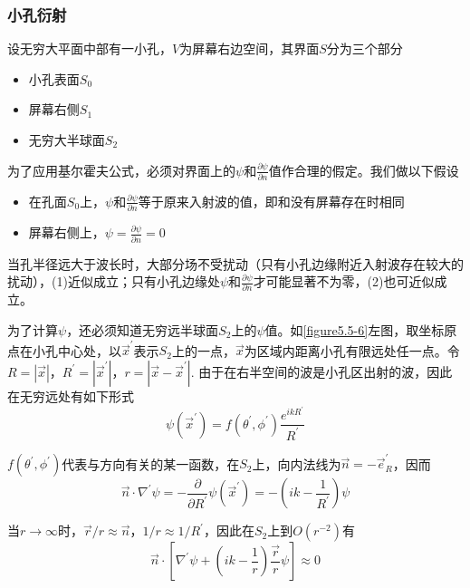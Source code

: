 \documentclass[UTF8]{ctexart}
\begin{document}
    \subsubsection{小孔衍射}
    设无穷大平面中部有一小孔，$V$为屏幕右边空间，其界面$S$分为三个部分
    \begin{itemize}
        \item 小孔表面$S_0$
        \item 屏幕右侧$S_1$
        \item 无穷大半球面$S_2$
    \end{itemize}

\noindent 为了应用基尔霍夫公式，必须对界面上的$\psi$和$\frac{\partial \psi}{\partial n}$值作合理的假定。我们做以下假设
\begin{itemize}
    \item 在孔面$S_0$上，$\psi$和$\frac{\partial \psi}{\partial n}$等于原来入射波的值，即和没有屏幕存在时相同
    \item 屏幕右侧上，$\psi = \frac{\partial \psi}{\partial n} = 0$
\end{itemize}

    当孔半径远大于波长时，大部分场不受扰动（只有小孔边缘附近入射波存在较大的扰动），(1)近似成立；只有小孔边缘处$\psi$和$\frac{\partial \psi}{\partial n}$才可能显著不为零，(2)也可近似成立。

    为了计算$\psi$，还必须知道无穷远半球面$S_2$上的$\psi$值。如\autoref{figure5.5-6}左图，取坐标原点在小孔中心处，以$\vec{x}^{\prime}$表示$S_2$上的一点，$\vec{x}$为区域内距离小孔有限远处任一点。令$R = |\vec{x}|$，$R^{\prime} = |\vec{x}^{\prime}|$，$r = |\vec{x}-\vec{x}^{\prime}|$. 由于在右半空间的波是小孔区出射的波，因此在无穷远处有如下形式
    \begin{equation}
        \psi(\vec{x}^{\prime}) = f(\theta^{\prime},\phi^{\prime}) \frac{e^{ikR^{\prime}}}{ R^{\prime}}
    \end{equation}

\noindent $f(\theta^{\prime},\phi^{\prime})$代表与方向有关的某一函数，在$S_2$上，向内法线为$\vec{n} = - \vec{e}_R^{\prime}$，因而 
\begin{equation}
    \vec{n} \cdot \nabla^{\prime} \psi = - \frac{\partial}{\partial R^{\prime}} \psi(\vec{x}^{\prime}) = -(ik - \frac{1}{R^{\prime}}) \psi 
\end{equation}

\noindent 当$r \to \infty$时，$\vec{r}/r \approx \vec{n}$，$1/r \approx 1/R^{\prime}$，因此在$S_2$上到$O(r^{-2})$有
\begin{equation}
    \vec{n} \cdot \left[\nabla^{\prime} \psi +\left(ik-\frac{1}{r} \right)\frac{\vec{r}}{r}\psi\right] \approx 0
\end{equation}
\end{document}
